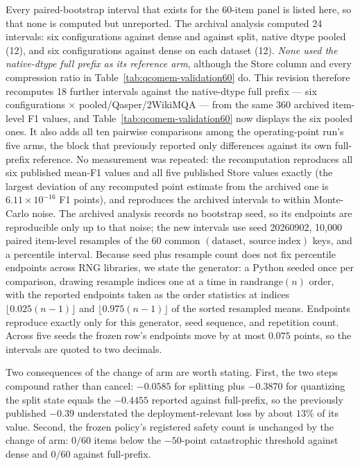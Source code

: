 \documentclass{article}
\begin{document}
Every paired-bootstrap interval that exists for the 60-item panel is listed
here, so that none is computed but unreported. The archival analysis computed
24 intervals: six configurations against dense and against split, native dtype
pooled (12), and six configurations against dense on each dataset (12).
\emph{None used the native-dtype full prefix as its reference arm}, although
the Store column and every compression ratio in
Table~\ref{tab:qcomem-validation60} do. This revision therefore recomputes 18
further intervals against the native-dtype full prefix --- six configurations
$\times$ pooled/Qasper/2WikiMQA --- from the same 360 archived item-level F1
values, and Table~\ref{tab:qcomem-validation60} now displays the six pooled
ones. It also adds all ten pairwise comparisons among the operating-point
run's five arms, the block that previously reported only differences against
its own full-prefix reference. No measurement was repeated: the recomputation
reproduces all six published mean-F1 values and all five published Store
values exactly (the largest deviation of any recomputed point estimate from
the archived one is $6.11\times10^{-16}$ F1 points), and reproduces the
archived intervals to within Monte-Carlo noise. The archived analysis records
no bootstrap seed, so its endpoints are reproducible only up to that noise;
the new intervals use seed 20260902, 10,000 paired item-level resamples of the
60 common $(\mathrm{dataset},\ \mathrm{source\ index})$ keys, and a percentile
interval. Because seed plus resample count does not fix percentile endpoints
across RNG libraries, we state the generator: a Python 
seeded once per comparison, drawing resample indices one at a time in
$\mathrm{randrange}(n)$ order, with the reported endpoints taken as the order
statistics at indices $\lfloor 0.025(n-1)\rfloor$ and $\lfloor
0.975(n-1)\rfloor$ of the sorted resampled means. Endpoints reproduce exactly
only for this generator, seed sequence, and repetition count. Across five
seeds the frozen row's endpoints move by at most $0.075$ points, so the
intervals are quoted to two decimals.

Two consequences of the change of arm are worth stating.  First, the two steps
compound rather than cancel: $-0.0585$ for splitting plus $-0.3870$ for
quantizing the split state equals the $-0.4455$ reported against full-prefix,
so the previously published $-0.39$ understated the deployment-relevant loss by
about $13\%$ of its value.  Second, the frozen policy's registered safety count
is unchanged by the change of arm: $0/60$ items below the $-50$-point
catastrophic threshold against dense and $0/60$ against full-prefix.
\end{document}

